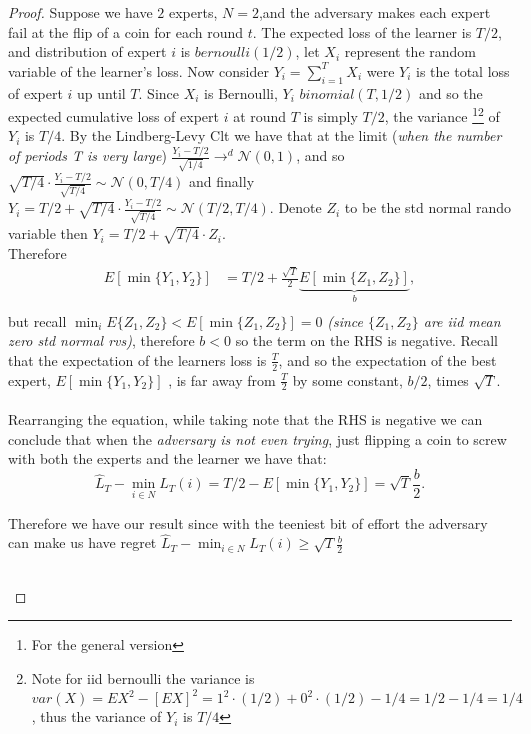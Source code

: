\documentclass[11pt]{article}
\theoremstyle{quest}
\begin{document}
\begin{proof}
Suppose we have $2$ experts, $N=2$,and the adversary makes each expert fail at the flip of a coin for each round $t$. The expected loss of the learner is $T/2$, and distribution of expert $i$ is $bernoulli(1/2)$,  let $X_i$ represent the random variable of the learner's loss.  Now consider $Y_i=\sum_{i=1}^TX_i$ were $Y_i$ is the total loss of expert $i$ up until $T$. Since $X_i$ is Bernoulli, $Y_i$ $binomial(T,1/2)$ and so the expected cumulative loss of expert $i$ at round $T$ is simply $T/2$,  the variance \footnote{For the general version}\footnote{Note for iid bernoulli the variance is $var(X)=EX^2-[EX]^2 = 1^2\cdot(1/2)+0^2\cdot(1/2) - 1/4=1/2-1/4= 1/4$, thus the variance of $Y_i$ is  $T/4$} of $Y_i$ is $T/4$. By the Lindberg-Levy Clt we have that at the limit (\textit{when the number of periods T is very large}) $\frac{Y_i-T/2}{\sqrt{1/4}}\rightarrow^d \mathcal{N}(0,1)$, and so $\sqrt{T/4} \cdot \frac{Y_i-T/2}{\sqrt{T/4}}\sim \mathcal{N}(0,T/4)$ and finally  $Y_i=T/2+\sqrt{T/4} \cdot \frac{Y_i-T/2}{\sqrt{T/4}}\sim \mathcal{N}(T/2,T/4)$. Denote $Z_i$ to be the std normal rando variable then $Y_i = T/2 +\sqrt{T/4}\cdot Z_i$. \\ Therefore 
 \begin{align*}
 E[\min\{Y_1,Y_2\}]&=T/2 +\frac{\sqrt{T}}{2}\underbrace{E[\min\{Z_1,Z_2\}]}_{b},\\
 \end{align*}
but recall $\min_iE\{Z_1,Z_2\}< E[\min\{Z_1,Z_2\}] =0$ \textit{(since $\{Z_1,Z_2\}$ are iid mean zero std normal rvs)}, therefore $b<0$ so the term on the RHS is negative. Recall that the expectation of the learners loss is $\frac{T}{2}$, and so the expectation of the best expert, $E[\min\{Y_1,Y_2\}]$ , is far away from $\frac{T}{2}$ by some constant, $b/2$, times $\sqrt{T}$.\\ \\ 
Rearranging the equation, while taking note that the RHS is negative we can conclude that when the \textit{adversary  is not even trying}, just flipping a coin to screw with both the experts and the learner we have that:
$$\hat{L}_T-\min_{i\in N}L_T(i)=T/2-E[\min\{Y_1,Y_2\}]= \sqrt{T}\frac{b}{2}.$$

 Therefore we have our result since with the teeniest bit of effort the adversary can make us have regret $\hat{L}_T-\min_{i\in N}L_T(i) \ge \sqrt{T}\frac{b}{2}$\\ \\

\begin{tcolorbox}


\end{tcolorbox}
\end{proof}
\end{document}
